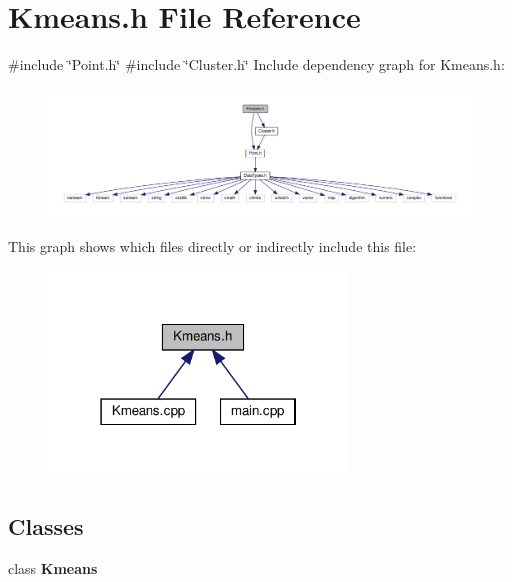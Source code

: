 \section{Kmeans.\+h File Reference}
\label{_kmeans_8h}
{\ttfamily \#include \char`\"{}Point.\+h\char`\"{}}\newline
{\ttfamily \#include \char`\"{}Cluster.\+h\char`\"{}}\newline
Include dependency graph for Kmeans.\+h\+:
\nopagebreak
\begin{figure}[H]
\begin{center}
\leavevmode
\includegraphics[width=350pt]{_kmeans_8h__incl}
\end{center}
\end{figure}
This graph shows which files directly or indirectly include this file\+:
\nopagebreak
\begin{figure}[H]
\begin{center}
\leavevmode
\includegraphics[width=226pt]{_kmeans_8h__dep__incl}
\end{center}
\end{figure}
\subsection*{Classes}
\begin{DoxyCompactItemize}
\item 
class \textbf{ Kmeans}
\end{DoxyCompactItemize}
